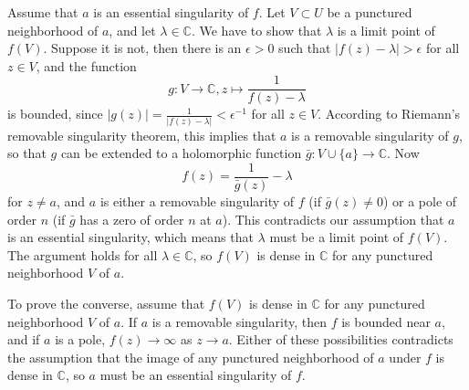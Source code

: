 \documentclass[12pt]{article}
\begin{document}
Assume that $a$ is an essential singularity of $f$.  Let $V\subset U$
be a punctured neighborhood of $a$, and let $\lambda\in\mathbb{C}$.
We have to show that $\lambda$ is a limit point of $f(V)$.  Suppose it
is not, then there is an $\epsilon>0$ such that
$|f(z)-\lambda|>\epsilon$ for all $z\in V$, and the function
$$
g:V\to\mathbb{C}, z\mapsto\frac{1}{f(z)-\lambda}
$$
is bounded, since $|g(z)|=\frac{1}{|f(z)-\lambda|}<\epsilon^{-1}$
for all $z\in V$.  According to Riemann's removable singularity
theorem, this implies that $a$ is a removable singularity of $g$, so
that $g$ can be extended to a holomorphic function $\bar
g:V\cup\{a\}\to\mathbb C$.  Now
$$
f(z)=\frac{1}{\bar g(z)}-\lambda
$$
for $z\neq a$, and $a$ is either a removable singularity of $f$ (if
$\bar g(z)\neq 0$) or a pole of order $n$ (if $\bar g$ has a zero of
order $n$ at $a$).  This contradicts our assumption that $a$ is an
essential singularity, which means that $\lambda$ must be a limit
point of $f(V)$.  The argument holds for all $\lambda\in\mathbb{C}$,
so $f(V)$ is dense in $\mathbb{C}$ for any punctured neighborhood $V$
of $a$.

To prove the converse, assume that $f(V)$ is dense in $\mathbb{C}$ for
any punctured neighborhood $V$ of $a$.  If $a$ is a removable
singularity, then $f$ is bounded near $a$, and if $a$ is a pole,
$f(z)\to\infty$ as $z\to a$.  Either of these possibilities
contradicts the assumption that the image of any punctured
neighborhood of $a$ under $f$ is dense in $\mathbb C$, so $a$ must be
an essential singularity of $f$.
\end{document}
